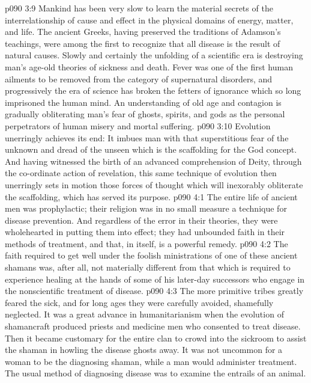 \vs p090 3:9 \bibnobreakspace {} Mankind has been very slow to learn the material secrets of the interrelationship of cause and effect in the physical domains of energy, matter, and life. The ancient Greeks, having preserved the traditions of Adamson’s teachings, were among the first to recognize that all disease is the result of natural causes. Slowly and certainly the unfolding of a scientific era is destroying man’s age\hyp{}old theories of sickness and death. Fever was one of the first human ailments to be removed from the category of supernatural disorders, and progressively the era of science has broken the fetters of ignorance which so long imprisoned the human mind. An understanding of old age and contagion is gradually obliterating man’s fear of ghosts, spirits, and gods as the personal perpetrators of human misery and mortal suffering.
\vs p090 3:10 \pc Evolution unerringly achieves its end: It imbues man with that superstitious fear of the unknown and dread of the unseen which is the scaffolding for the God concept. And having witnessed the birth of an advanced comprehension of Deity, through the co\hyp{}ordinate action of revelation, this same technique of evolution then unerringly sets in motion those forces of thought which will inexorably obliterate the scaffolding, which has served its purpose.
\vs p090 4:1 The entire life of ancient men was prophylactic; their religion was in no small measure a technique for disease prevention. And regardless of the error in their theories, they were wholehearted in putting them into effect; they had unbounded faith in their methods of treatment, and that, in itself, is a powerful remedy.
\vs p090 4:2 \pc The faith required to get well under the foolish ministrations of one of these ancient shamans was, after all, not materially different from that which is required to experience healing at the hands of some of his later\hyp{}day successors who engage in the nonscientific treatment of disease.
\vs p090 4:3 \pc The more primitive tribes greatly feared the sick, and for long ages they were carefully avoided, shamefully neglected. It was a great advance in humanitarianism when the evolution of shamancraft produced priests and medicine men who consented to treat disease. Then it became customary for the entire clan to crowd into the sickroom to assist the shaman in howling the disease ghosts away. It was not uncommon for a woman to be the diagnosing shaman, while a man would administer treatment. The usual method of diagnosing disease was to examine the entrails of an animal.
